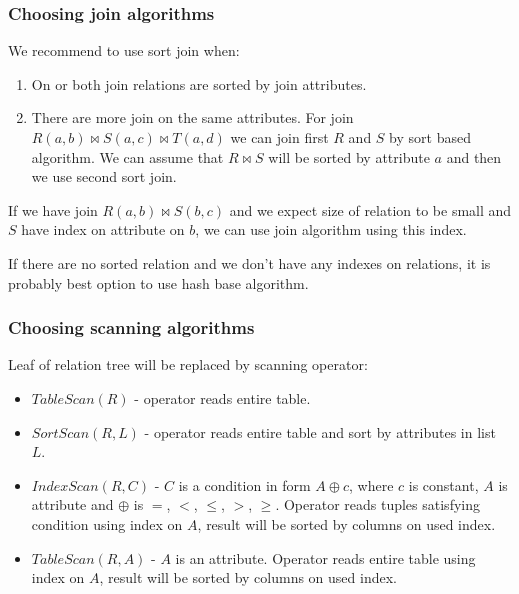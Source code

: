 \subsubsection{Choosing join algorithms}

We recommend to use sort join when:

\begin{enumerate}
\item On or both join relations are sorted by join attributes.
\item There are more join on the same attributes. For join $R(a,b)\Join S(a,c) \Join T(a,d)$ we can join first $R$ and $S$ by sort based algorithm. We can assume that $R \Join S$ will be sorted by attribute $a$ and then we use second sort join.

\end{enumerate}

If we have join $R(a,b)\Join S(b,c)$ and we expect size of relation to be small and $S$ have index on attribute on $b$, we can use join algorithm using this index.

If there are no sorted relation and we don't have any indexes on relations, it is probably best option to use hash base algorithm.

\subsubsection{Choosing scanning algorithms}

Leaf of relation tree will be replaced by scanning operator:

\begin{itemize}
\item $TableScan(R)$ - operator reads entire table.

\item $SortScan(R,L)$ - operator reads entire table and sort by attributes in list~$L$.

\item $IndexScan(R,C)$ - $C$ is a condition in form $A\oplus c$, where $c$ is constant, $A$ is attribute and $\oplus$ is $=$, $<$, $\leq$, $>$, $\geq$. Operator reads tuples satisfying condition using index on $A$, result will be sorted by columns on used index.

\item $TableScan(R,A)$ - $A$ is an attribute. Operator reads entire table using index on $A$, result will be sorted by columns on used index.

\end{itemize}

